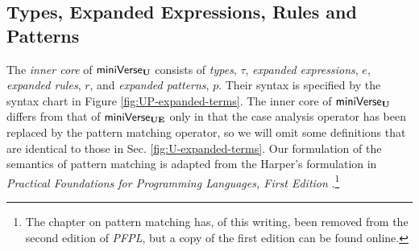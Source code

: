 {{{{\subsection{Types, Expanded Expressions, Rules and Patterns}\label{sec:UP-expanded-terms}
The \emph{inner core} of $\mathsf{miniVerse}_\textbf{U}$ consists of \emph{types}, $\tau$, \emph{expanded expressions}, $e$, \emph{expanded rules}, $r$, and \emph{expanded patterns}, $p$. Their syntax is specified by the syntax chart in Figure \ref{fig:UP-expanded-terms}. The inner core of $\mathsf{miniVerse}_\textbf{U}$ differs from that of $\mathsf{miniVerse}_\textbf{UE}$  only in that the case analysis operator has been replaced by the pattern matching operator, so we will omit some definitions that are identical to those in Sec. \ref{fig:U-expanded-terms}. Our formulation of the semantics of pattern matching is adapted from the Harper's formulation in \emph{Practical Foundations for Programming Languages, First Edition} \cite{pfple1}.\footnote{The chapter on pattern matching has, of this writing, been removed from the second edition of \emph{PFPL}, but a copy of the first edition can be found online.}

}}}}

